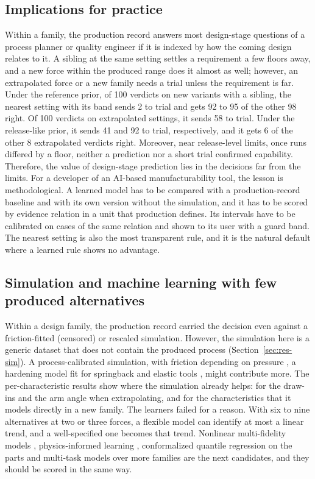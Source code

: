 \documentclass[pdflatex,sn-basic,lineno]{sn-jnl}
\begin{document}
\subsection{Implications for practice}

Within a family, the production record answers most design-stage questions of a process planner or quality engineer if it is indexed by how the coming design relates to it. A sibling at the same setting settles a requirement a few floors away, and a new force within the produced range does it almost as well; however, an extrapolated force or a new family needs a trial unless the requirement is far. Under the reference prior, of 100 verdicts on new variants with a sibling, the nearest setting with its band sends 2 to trial and gets 92 to 95 of the other 98 right. Of 100 verdicts on extrapolated settings, it sends 58 to trial. Under the release-like prior, it sends 41 and 92 to trial, respectively, and it gets 6 of the other 8 extrapolated verdicts right. Moreover, near release-level limits, once runs differed by a floor, neither a prediction nor a short trial confirmed capability. Therefore, the value of design-stage prediction lies in the decisions far from the limits. For a developer of an AI-based manufacturability tool, the lesson is methodological. A learned model has to be compared with a production-record baseline and with its own version without the simulation, and it has to be scored by evidence relation in a unit that production defines. Its intervals have to be calibrated on cases of the same relation and shown to its user with a guard band. The nearest setting is also the most transparent rule, and it is the natural default where a learned rule shows no advantage.

\subsection{Simulation and machine learning with few produced alternatives}

Within a design family, the production record carried the decision even against a friction-fitted (censored) or rescaled simulation. However, the simulation here is a generic dataset that does not contain the produced process (Section~\ref{sec:res-sim}). A process-calibrated simulation, with friction depending on pressure \citep{hol2012advanced}, a hardening model fit for springback \citep{wagoner2013advanced} and elastic tools \citep{pilthammar2018introduction}, might contribute more. The per-characteristic results show where the simulation already helps: for the draw-ins and the arm angle when extrapolating, and for the characteristics that it models directly in a new family. The learners failed for a reason. With six to nine alternatives at two or three forces, a flexible model can identify at most a linear trend, and a well-specified one becomes that trend. Nonlinear multi-fidelity models \citep{perdikaris2017nonlinear}, physics-informed learning \citep{karniadakis2021physics}, conformalized quantile regression on the parts \citep{romano2019conformalized} and multi-task models over more families \citep{bonilla2008multi} are the next candidates, and they should be scored in the same way.
\end{document}
